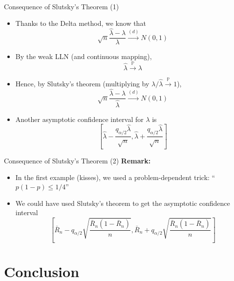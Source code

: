 \documentclass[aspectratio=169]{beamer}
\begin{document}
\begin{frame}{Consequence of Slutsky's Theorem (1)}
\begin{itemize}
    \item Thanks to the Delta method, we know that
    \[\sqrt{n}\frac{\hat{\lambda} - \lambda}{\lambda} \xrightarrow{(d)} N(0, 1)\]

    \item By the weak LLN (and continuous mapping),
    \[\hat{\lambda} \xrightarrow{\mathbb{P}} \lambda\]

    \item Hence, by Slutsky's theorem (multiplying by $\lambda/\hat{\lambda} \xrightarrow{\mathbb{P}} 1$),
    \[\sqrt{n}\frac{\hat{\lambda} - \lambda}{\hat{\lambda}} \xrightarrow{(d)} N(0, 1)\]

    \item Another asymptotic confidence interval for $\lambda$ is
    \[\left[\hat{\lambda} - \frac{q_{\alpha/2}\hat{\lambda}}{\sqrt{n}}, \hat{\lambda} + \frac{q_{\alpha/2}\hat{\lambda}}{\sqrt{n}}\right]\]
\end{itemize}
\end{frame}

\begin{frame}{Consequence of Slutsky's Theorem (2)}
\textbf{Remark:}
\begin{itemize}
    \item In the first example (kisses), we used a problem-dependent trick: ``$p(1-p) \leq 1/4$''

    \item We could have used Slutsky's theorem to get the asymptotic confidence interval
    \[\left[\bar{R}_n - q_{\alpha/2}\sqrt{\frac{\bar{R}_n(1-\bar{R}_n)}{n}}, \bar{R}_n + q_{\alpha/2}\sqrt{\frac{\bar{R}_n(1-\bar{R}_n)}{n}}\right]\]
\end{itemize}
\end{frame}

\section{Conclusion}
\end{document}
